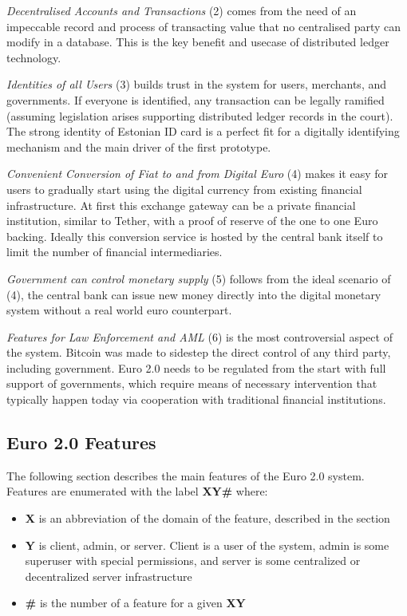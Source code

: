 \documentclass[12pt]{article} %
\newcommand{\hypernameref}[1]{\hyperref[#1]{\nameref{#1}}}
\begin{document}
{{\textit{Decentralised Accounts and Transactions} (2) comes from the need of an impeccable record and process of transacting value that no centralised party can modify in a database. This is the key benefit and usecase of distributed ledger technology.

\textit{Identities of all Users} (3) builds trust in the system for users, merchants, and governments. If everyone is identified, any transaction can be legally ramified (assuming legislation arises supporting distributed ledger records in the court). The strong identity of Estonian ID card is a perfect fit for a digitally identifying mechanism and the main driver of the first prototype.

\textit{Convenient Conversion of Fiat to and from Digital Euro} (4) makes it easy for users to gradually start using the digital currency from existing financial infrastructure. At first this exchange gateway can be a private financial institution, similar to Tether\cite{tether2016whitepaper}, with a proof of reserve of the one to one Euro backing. Ideally this conversion service is hosted by the central bank itself to limit the number of financial intermediaries.

\textit{Government can control monetary supply} (5) follows from the ideal scenario of (4), the central bank can issue new money directly into the digital monetary system without a real world euro counterpart.

\textit{Features for Law Enforcement and AML} (6) is the most controversial aspect of the system. Bitcoin was made to sidestep the direct control of any third party, including government\cite{nakamoto2008bitcoin}. Euro 2.0 needs to be regulated from the start with full support of governments, which require means of necessary intervention that typically happen today via cooperation with traditional financial institutions.

\subsection{Euro 2.0 Features} \label{ssec:3.3}

The following section describes the main features of the Euro 2.0 system. Features are enumerated with the label \textbf{XY\#} where:
\begin{itemize}
	\item \textbf{X} is an abbreviation of the domain of the feature, described in the \hypernameref{sssec:3.3:domains} section
	\item \textbf{Y} is client, admin, or server. Client is a user of the system, admin is some superuser with special permissions, and server is some centralized or decentralized server infrastructure
	\item \textbf{\#} is the number of a feature for a given \textbf{XY}
\end{itemize}

}}
\end{document}
